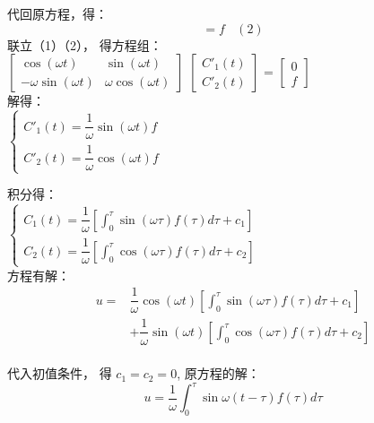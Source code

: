 \begin{frame}
	代回原方程，得：
	\begin{equation*}
		[  - \omega C'_1(t) \sin(\omega t)+ \omega C'_2(t) \cos(\omega t)  ] =f      ~~~~  \left( 2\right)
	\end{equation*}  
	联立（1）（2）， 得方程组：\\  	
	$\begin{bmatrix}
		\cos(\omega t) & \sin(\omega t) \\ 
		-\omega \sin(\omega t) & \omega\cos(\omega t)
	\end{bmatrix} $
	$\begin{bmatrix}
		C'_1(t)\\ 
		C'_2(t)
	\end{bmatrix} $ =
	$\begin{bmatrix}
		0\\ 
		f
	\end{bmatrix} $ \\ \vspace{0.3cm}
	解得：\\  
	$\displaystyle \begin{cases}
		C'_1(t)=\dfrac{1}{\omega} \sin(\omega t) f \\ 
		C'_2(t)=\dfrac{1}{\omega} \cos(\omega t) f 
	\end{cases} $ 
\end{frame}

\begin{frame}
	积分得：\\  
	$\displaystyle \begin{cases}
		C_1(t)=\dfrac{1}{\omega} [\int_{0}^{\tau} \sin(\omega \tau) f(\tau)  d\tau +c_1 ]\\ 
		C_2(t)=\dfrac{1}{\omega} [\int_{0}^{\tau} \cos(\omega \tau) f(\tau)  d\tau +c_2 ]\
	\end{cases} $ \\ \vspace{0.3cm}
	方程有解：\\
	\begin{align*}
		u=&\dfrac{1}{\omega}\cos(\omega t)[\int_{0}^{\tau} \sin(\omega \tau) f(\tau)  d\tau +c_1 ] \\
		&+\dfrac{1}{\omega} \sin(\omega t) [\int_{0}^{\tau} \cos(\omega \tau) f(\tau)  d\tau +c_2 ]
	\end{align*} \\ \vspace{0.3cm}
	代入初值条件， 得 $c_1=c_2=0$, 原方程的解：\\
	\begin{equation*}
		u=\frac{1}{\omega}\int_{0}^{\tau} \sin\omega (t-\tau)  f(\tau)  d\tau
	\end{equation*}   
\end{frame}

